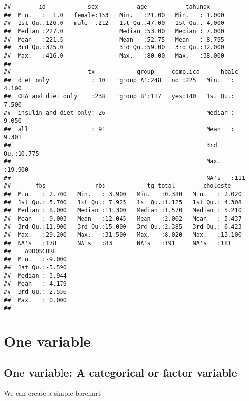 \documentclass[]{book}
\theoremstyle{definition}
\theoremstyle{definition}
\theoremstyle{remark}
\begin{document}
\begin{verbatim}
##        id            sex           age           tahundx      
##  Min.   :  1.0   female:153   Min.   :21.00   Min.   : 1.000  
##  1st Qu.:126.0   male  :212   1st Qu.:47.00   1st Qu.: 4.000  
##  Median :227.0                Median :53.00   Median : 7.000  
##  Mean   :221.5                Mean   :52.75   Mean   : 8.795  
##  3rd Qu.:325.0                3rd Qu.:59.00   3rd Qu.:12.000  
##  Max.   :416.0                Max.   :80.00   Max.   :38.000  
##                                                               
##                      tx            group     complica      hba1c       
##  diet only            : 10   "group A":248   no :225   Min.   : 4.100  
##  OHA and diet only    :238   "group B":117   yes:140   1st Qu.: 7.500  
##  insulin and diet only: 26                             Median : 9.050  
##  all                  : 91                             Mean   : 9.301  
##                                                        3rd Qu.:10.775  
##                                                        Max.   :19.900  
##                                                        NA's   :111     
##       fbs              rbs            tg_total        choleste     
##  Min.   : 2.700   Min.   : 3.900   Min.   :0.380   Min.   : 2.020  
##  1st Qu.: 5.700   1st Qu.: 7.925   1st Qu.:1.125   1st Qu.: 4.308  
##  Median : 8.000   Median :11.300   Median :1.570   Median : 5.210  
##  Mean   : 9.003   Mean   :12.045   Mean   :2.002   Mean   : 5.437  
##  3rd Qu.:11.900   3rd Qu.:15.000   3rd Qu.:2.385   3rd Qu.: 6.423  
##  Max.   :29.200   Max.   :31.500   Max.   :8.020   Max.   :13.100  
##  NA's   :178      NA's   :83       NA's   :191     NA's   :181     
##    ADDQSCORE     
##  Min.   :-9.000  
##  1st Qu.:-5.590  
##  Median :-3.944  
##  Mean   :-4.179  
##  3rd Qu.:-2.556  
##  Max.   : 0.000  
## 
\end{verbatim}

\section{One variable}\label{one-variable}

\subsection{One variable: A categorical or factor
variable}\label{one-variable-a-categorical-or-factor-variable}

We can create a simple barchart
\end{document}
